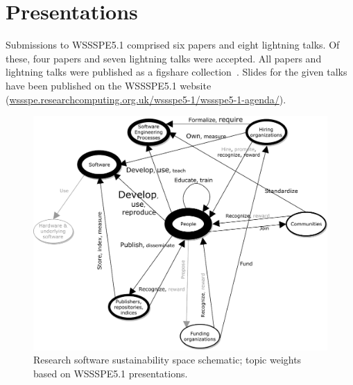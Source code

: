 \documentclass[11pt,letterpaper]{article}
\newcommand{\katznote}[1]{ {\textcolor{magenta}    { ***Dan: #1 }}}
\newcommand{\sdnote}[1]{ {\textcolor{darkgreen}    { ***Stephan: #1 }}}
\begin{document}
\section{Presentations}\label{sec:presentations}


Submissions to WSSSPE5.1 comprised six papers %
and eight lightning talks. %
Of these, four papers \cite{nangia_track_2017,haupt_track_2017,queiroz_track_2017,mulholland_track_2017} %
and seven lightning talks \cite{silva_track_2017,struck_track_2017,washbrook_track_2017,dasler_track_2017,alhozaimy_track_2017,maassen_track_2017,druskat_track_2017} %
were accepted.
All papers and lightning talks were published as a figshare collection~\cite{WSSSPE5_1_proceedings_2017}. Slides for the given talks have been published on the WSSSPE5.1 website (\href{http://wssspe.researchcomputing.org.uk/wssspe5-1/wssspe5-1-agenda/}{wssspe.researchcomputing.org.uk/wssspe5-1/wssspe5-1-agenda/}).



\begin{figure}[h!]
  \centering
  \includegraphics[width=\textwidth]{sustainability-schematic-weighted-jors.pdf}
  \caption{Research software sustainability space schematic; topic weights based on WSSSPE5.1 presentations.}
  \label{fig:schematic}
\end{figure}
\end{document}
